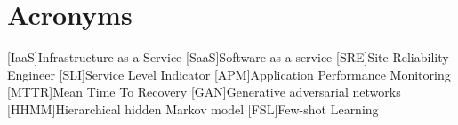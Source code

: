 \chapter*{Acronyms}

\begin{acronym}
[IaaS]{Infrastructure as a Service}
[SaaS]{Software as a service}
[SRE]{Site Reliability Engineer}
[SLI]{Service Level Indicator}
[APM]{Application Performance Monitoring}
[MTTR]{Mean Time To Recovery}
[GAN]{Generative adversarial networks}
[HHMM]{Hierarchical hidden Markov model}
[FSL]{Few-shot Learning}
\end{acronym}